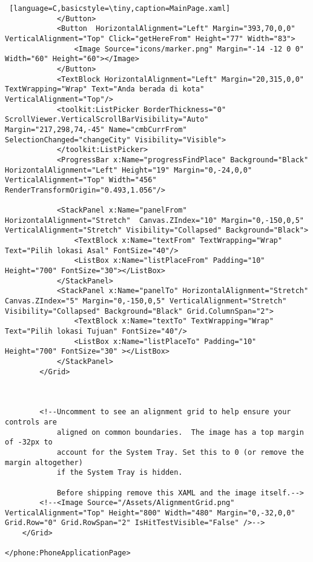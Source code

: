 \begin{lstlisting} [language=C,basicstyle=\tiny,caption=MainPage.xaml]
            </Button>
            <Button  HorizontalAlignment="Left" Margin="393,70,0,0" VerticalAlignment="Top" Click="getHereFrom" Height="77" Width="83">
                <Image Source="icons/marker.png" Margin="-14 -12 0 0" Width="60" Height="60"></Image>
            </Button>
            <TextBlock HorizontalAlignment="Left" Margin="20,315,0,0" TextWrapping="Wrap" Text="Anda berada di kota" VerticalAlignment="Top"/>
            <toolkit:ListPicker BorderThickness="0" ScrollViewer.VerticalScrollBarVisibility="Auto" Margin="217,298,74,-45" Name="cmbCurrFrom" SelectionChanged="changeCity" Visibility="Visible">
            </toolkit:ListPicker>
            <ProgressBar x:Name="progressFindPlace" Background="Black" HorizontalAlignment="Left" Height="19" Margin="0,-24,0,0" VerticalAlignment="Top" Width="456" RenderTransformOrigin="0.493,1.056"/>

            <StackPanel x:Name="panelFrom" HorizontalAlignment="Stretch"  Canvas.ZIndex="10" Margin="0,-150,0,5" VerticalAlignment="Stretch" Visibility="Collapsed" Background="Black">
                <TextBlock x:Name="textFrom" TextWrapping="Wrap" Text="Pilih lokasi Asal" FontSize="40"/>
                <ListBox x:Name="listPlaceFrom" Padding="10" Height="700" FontSize="30"></ListBox>
            </StackPanel>
            <StackPanel x:Name="panelTo" HorizontalAlignment="Stretch"  Canvas.ZIndex="5" Margin="0,-150,0,5" VerticalAlignment="Stretch"  Visibility="Collapsed" Background="Black" Grid.ColumnSpan="2">
                <TextBlock x:Name="textTo" TextWrapping="Wrap" Text="Pilih lokasi Tujuan" FontSize="40"/>
                <ListBox x:Name="listPlaceTo" Padding="10" Height="700" FontSize="30" ></ListBox>
            </StackPanel>
        </Grid>



        <!--Uncomment to see an alignment grid to help ensure your controls are
            aligned on common boundaries.  The image has a top margin of -32px to
            account for the System Tray. Set this to 0 (or remove the margin altogether)
            if the System Tray is hidden.

            Before shipping remove this XAML and the image itself.-->
        <!--<Image Source="/Assets/AlignmentGrid.png" VerticalAlignment="Top" Height="800" Width="480" Margin="0,-32,0,0" Grid.Row="0" Grid.RowSpan="2" IsHitTestVisible="False" />-->
    </Grid>

</phone:PhoneApplicationPage>
\end{lstlisting}